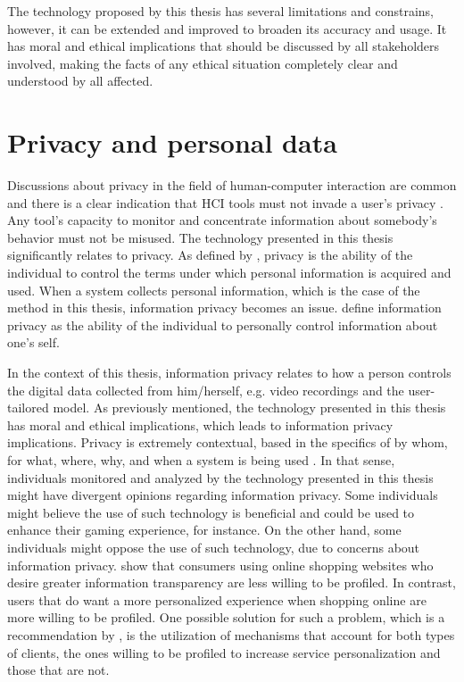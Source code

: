The technology proposed by this thesis has several limitations and constrains, however, it can be extended and improved to broaden its accuracy and usage. It has moral and ethical implications that should be discussed by all stakeholders involved, making the facts of any ethical situation completely clear and understood by all affected.

\section{Privacy and personal data}
\label{sec:ethics-privacy}

Discussions about privacy in the field of human-computer interaction are common and there is a clear indication that HCI tools must not invade a user's privacy \parencite{pantic2003toward}. Any tool's capacity to monitor and concentrate information about somebody's behavior must not be misused. The technology presented in this thesis significantly relates to privacy. As defined by \textcite{culnan2000protecting}, privacy is the ability of the individual to control the terms under which personal information is acquired and used. When a system collects personal information, which is the case of the method in this thesis, information privacy becomes an issue. \textcite{stone1983field} define information privacy as the ability of the individual to personally control information about one's self.

In the context of this thesis, information privacy relates to how a person controls the digital data collected from him/herself, e.g. video recordings and the user-tailored model. As previously mentioned, the technology presented in this thesis has moral and ethical implications, which leads to information privacy implications. Privacy is extremely contextual, based in the specifics of by whom, for what, where, why, and when a system is being used \parencite{ackerman2005privacy}. In that sense, individuals monitored and analyzed by the technology presented in this thesis might have divergent opinions regarding information privacy. Some individuals might believe the use of such technology is beneficial and could be used to enhance their gaming experience, for instance. On the other hand, some individuals might oppose the use of such technology, due to concerns about information privacy. \textcite{awad2006personalization} show that consumers using online shopping websites who desire greater information transparency are less willing to be profiled. In contrast, users that do want a more personalized experience when shopping online are more willing to be profiled. One possible solution for such a problem, which is a recommendation by \textcite{awad2006personalization}, is the utilization of mechanisms that account for both types of clients, the ones willing to be profiled to increase service personalization and those that are not.

